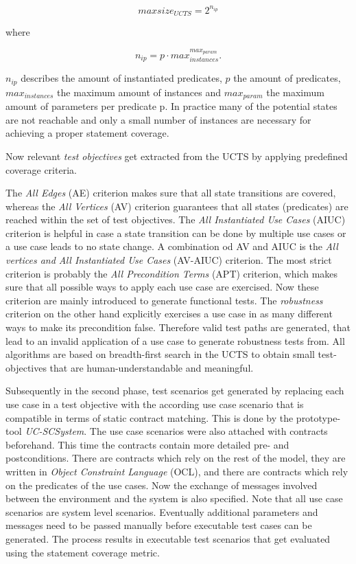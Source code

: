 \begin{equation}
	maxsize_{UCTS} = 2^{n_{ip}}
\end{equation}

where

\begin{equation}
	n_{ip} = p \cdot max_{instances}^{max_{param}}.
\end{equation}

$n_{ip}$ describes the amount of instantiated predicates, $p$ the amount of predicates, $max_{instances}$ the maximum amount of instances and $max_{param}$ the maximum amount of parameters per predicate p. In practice many of the potential states are not reachable and only a small number of instances are necessary for achieving a proper statement coverage. 

Now relevant \textit{test objectives} get extracted from the UCTS by applying predefined coverage criteria. 

The \textit{All Edges} (AE) criterion makes sure that all state transitions are covered, whereas the \textit{All Vertices} (AV) criterion guarantees that all states (predicates) are reached within the set of test objectives.  The \textit{All Instantiated Use Cases} (AIUC) criterion is helpful in case a state transition can be done by multiple use cases or a use case leads to no state change. A combination od AV and AIUC is the \textit{All vertices and All Instantiated Use Cases} (AV-AIUC) criterion. The most strict criterion is probably the \textit{All Precondition Terms} (APT) criterion, which makes sure that all possible ways to apply each use case are exercised. Now these criterion are mainly introduced to generate functional tests. The \textit{robustness} criterion on the other hand explicitly exercises a use case in as many different ways to make its precondition false. Therefore valid test paths are generated, that lead to an invalid application of a use case to generate robustness tests from. All algorithms are based on breadth-first search in the UCTS to obtain small test-objectives that are human-understandable and meaningful. 

Subsequently in the second phase, test scenarios get generated by replacing each use case in a test objective with the according use case scenario that is compatible in terms of static contract matching. This is done by the prototype-tool \textit{UC-SCSystem}. The use case scenarios were also attached with contracts beforehand. This time the contracts contain more detailed pre- and postconditions. There are contracts which rely on the rest of the model, they are written in \textit{Object Constraint Language} (OCL), and there are contracts which rely on the predicates of the use cases. Now the exchange of messages involved between the environment and the system is also specified. Note that all use case scenarios are system level scenarios. Eventually additional parameters and messages need to be passed manually before executable test cases can be generated. The process results in executable test scenarios that get evaluated using the statement coverage metric.

